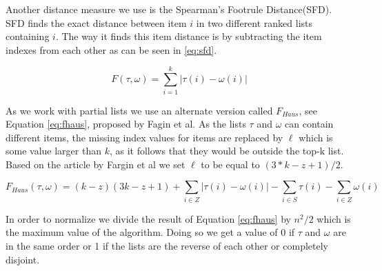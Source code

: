 Another distance measure we use is the Spearman's Footrule Distance(SFD)\cite{comparing:topk}. SFD finds the exact distance between item $i$ in two different ranked lists containing $i$. The way it finds this item distance is by subtracting the item indexes from each other as can be seen in \ref{eq:sfd}. 

\begin{equation}\label{eq:sfd}
F(\tau, \omega) = \sum_{i=1}^{k} | \tau (i) - \omega (i) |
\end{equation}

As we work with partial lists we use an alternate version called $F_{Haus}$, see Equation \ref{eq:fhaus}, proposed by Fagin et al\citep{comparing:topk}.
As the lists $\tau$ and $\omega$ can contain different items, the missing index values for items are replaced by $\ell$ which is some value larger than $k$, as it follows that they would be outside the top-k list. Based on the article by Fargin et al we set $\ell$ to be equal to $(3 * k - z + 1)/2$.

\footnotesize
\begin{equation}\label{eq:fhaus}
F_{Haus}(\tau,\omega)= (k-z)(3k-z+1)+\sum_{i\in Z} | \tau (i) - \omega (i) | - \sum_{i\in S} \tau (i) - \sum_{i\in Z} \omega(i)
\end{equation}
\normalsize

In order to normalize we divide the result of Equation \ref{eq:fhaus} by $n^2 /2$ which is the maximum value of the algorithm. Doing so we get a value of 0 if $\tau$ and $\omega$ are in the same order or 1 if the lists are the reverse of each other or completely disjoint.